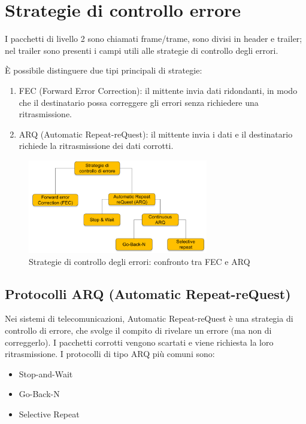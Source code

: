 \section{Strategie di controllo errore}
I pacchetti di livello 2 sono chiamati frame/trame, sono divisi in header e trailer; nel trailer sono presenti i campi utili alle strategie di controllo degli errori.

È possibile distinguere due tipi principali di strategie:
\begin{enumerate}
    \item FEC (Forward Error Correction): il mittente invia dati ridondanti, in modo che il destinatario possa correggere gli errori senza richiedere una ritrasmissione.
    \item ARQ (Automatic Repeat-reQuest): il mittente invia i dati e il destinatario richiede la ritrasmissione dei dati corrotti. 
\end{enumerate}

\begin{figure}[htbp]
    \centering
    \includegraphics[width=0.7\textwidth]{images/strategierrore.png}
    \caption{Strategie di controllo degli errori: confronto tra FEC e ARQ}
\end{figure}

\subsection{Protocolli ARQ (Automatic Repeat-reQuest)}
Nei sistemi di telecomunicazioni, Automatic Repeat-reQuest è una strategia di controllo di errore, che svolge il compito di rivelare un errore (ma non di correggerlo). I pacchetti corrotti vengono scartati e viene richiesta la loro ritrasmissione.
I protocolli di tipo ARQ più comuni sono:

\begin{multicols}{3}
\begin{itemize}
    \item Stop-and-Wait 
    \item Go-Back-N 
    \item Selective Repeat
\end{itemize}
\end{multicols}


